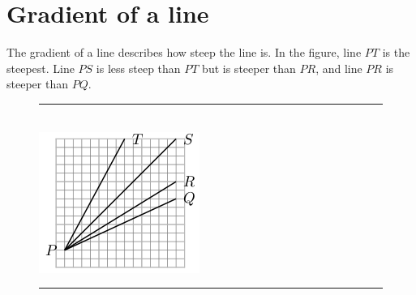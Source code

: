       \label{m39107**end}
%     
%     
%     
      \label{m39108*uid40}
            \section{ Gradient of a line}
            \nopagebreak
\label{m39108*id67971}The gradient of a line describes how steep the line is. In the figure, line \begin{math}PT\end{math} is the steepest. Line \begin{math}PS\end{math} is less steep than \begin{math}PT\end{math} but is steeper than \begin{math}PR\end{math}, and line \begin{math}PR\end{math} is steeper than \begin{math}PQ\end{math}.\par 
    \setcounter{subfigure}{0}
	\begin{figure}[H] %
    \begin{center}
    \rule[.1in]{\figurerulewidth}{.005in} \\
        \label{m39108*uid41!!!underscore!!!media}\label{m39108*uid41!!!underscore!!!printimage}\includegraphics{col11306.imgs/m39108_MG10C14_017.png} %
      \vspace{2pt}
    \vspace{.1in}
    \rule[.1in]{\figurerulewidth}{.005in} \\
    \end{center}
 \end{figure}       
